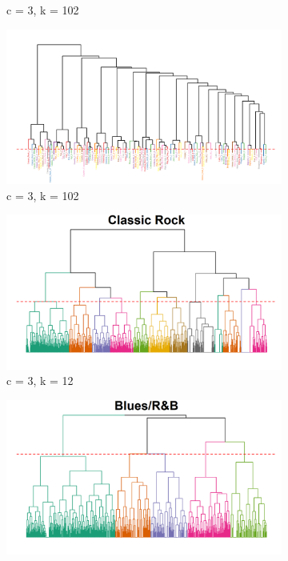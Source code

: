 \documentclass[a4paper,12pt]{extarticle}
\begin{document}
\begin{figure}[ht!]
\begin{subfigure}[b]{0.5\textwidth}
        \caption{c = 3, k = 102}
        \label{fig:dend-micro}
    \end{subfigure} 
     \begin{subfigure}[b]{0.5\textwidth}
        \centering
        \includegraphics[width=1.0\textwidth]{Figs/Dend/all-branches-micro-labels.png}
        \caption{c = 3, k = 102}
        \label{fig:dend-micro-labels}
    \end{subfigure}
     \begin{subfigure}[b]{0.32\textwidth}
        \centering
        \includegraphics[width=1.0\textwidth]{Figs/Dend/classic-rock-branches.png}
        \caption{c = 3, k = 12}
        \label{fig:dend-micro-classic-rock}
    \end{subfigure} 
     \begin{subfigure}[b]{0.32\textwidth}
        \centering
        \includegraphics[width=1.0\textwidth]{Figs/Dend/blues-branches.png}

\end{subfigure}
\end{figure}
\end{document}
